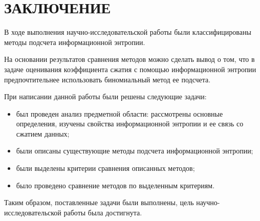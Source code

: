 \chapter*{ЗАКЛЮЧЕНИЕ}

В ходе выполнения научно-исследовательской работы были классифицированы методы подсчета информационной энтропии.

На основании результатов сравнения методов можно сделать вывод о том, что в задаче оценивания коэффициента сжатия с помощью информационной энтропии предпочтительнее использовать биномиальный метод ее подсчета.

При написании данной работы были решены следующие задачи:

\begin{itemize}
	\item был проведен анализ предметной области: рассмотрены основные определения, изучены свойства информационной энтропии и ее связь со сжатием данных;
	\item были описаны существующие методы подсчета информационной энтропии;
	\item были выделены критерии сравнения описанных методов;
	\item было проведено сравнение методов по выделенным критериям.
\end{itemize}

Таким образом, поставленные задачи были выполнены, цель научно-исследовательской работы была достигнута.